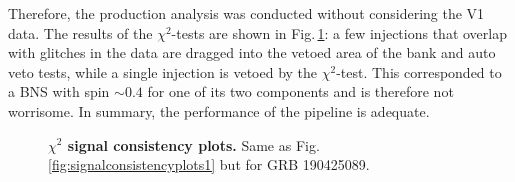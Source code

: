 \documentclass[binding=0.6cm, LaM]{sapthesis}
\begin{document}
 	Therefore, the production analysis was conducted without considering the V1 data.
	The results of the $\chi^2$-tests are shown in Fig.\,\ref{fig:signalconsistencyplots3_final}:
       	a few injections that overlap with glitches in the data are dragged into the vetoed area of the bank and auto veto tests, while a single injection is vetoed by the $\chi^2$-test.  This corresponded to a BNS with spin $\sim 0.4$ for one of its two components and is therefore not worrisome.  In summary, the performance of the pipeline is adequate.

        \begin{figure}[!t]
          \noindent
          \label{signalconsistencyplots3_final}
          \centering
          \caption{\textbf{$\chi^2$ signal consistency plots.} Same as Fig.\,\ref{fig:signalconsistencyplots1} but for GRB 190425089.}
          \label{fig:signalconsistencyplots3_final}
        \end{figure}
\end{document}
